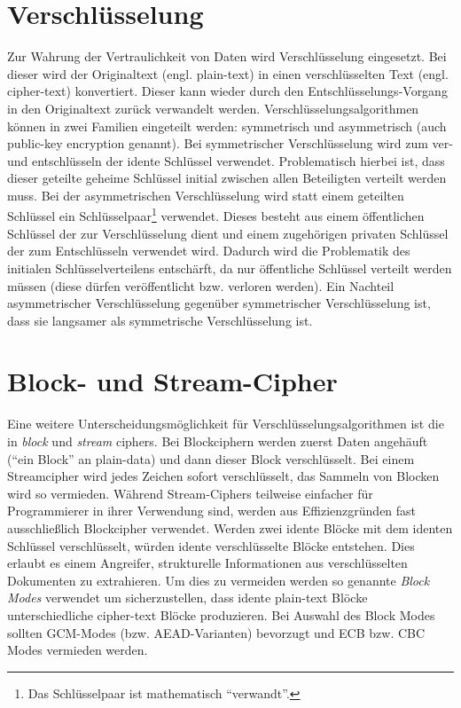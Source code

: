 \section{Verschlüsselung}

Zur Wahrung der Vertraulichkeit von Daten wird Verschlüsselung eingesetzt. Bei dieser wird der Originaltext (engl. plain-text) in einen verschlüsselten Text (engl. cipher-text) konvertiert. Dieser kann wieder durch den Entschlüsselungs-Vorgang in den Originaltext zurück verwandelt werden. Verschlüsselungsalgorithmen können in zwei Familien eingeteilt werden: symmetrisch und asymmetrisch (auch public-key encryption genannt). Bei symmetrischer Verschlüsselung wird zum ver- und entschlüsseln der idente Schlüssel verwendet. Problematisch hierbei ist, dass dieser geteilte geheime Schlüssel initial zwischen allen Beteiligten verteilt werden muss. Bei der asymmetrischen Verschlüsselung wird statt einem geteilten Schlüssel ein Schlüsselpaar\footnote{Das Schlüsselpaar ist mathematisch ``verwandt''.} verwendet. Dieses besteht aus einem öffentlichen Schlüssel der zur Verschlüsselung dient und einem zugehörigen privaten Schlüssel der zum Entschlüsseln verwendet wird. Dadurch wird die Problematik des initialen Schlüsselverteilens entschärft, da nur öffentliche Schlüssel verteilt werden müssen (diese dürfen veröffentlicht bzw. verloren werden). Ein Nachteil asymmetrischer Verschlüsselung gegenüber symmetrischer Verschlüsselung ist, dass sie langsamer als symmetrische Verschlüsselung ist.

\section{Block- und Stream-Cipher}

Eine weitere Unterscheidungsmöglichkeit für Verschlüsselungsalgorithmen ist die in \textit{block} und \textit{stream} ciphers. Bei Blockciphern werden zuerst Daten angehäuft (``ein Block'' an plain-data) und dann dieser Block verschlüsselt. Bei einem Streamcipher wird jedes Zeichen sofort verschlüsselt, das Sammeln von Blocken wird so vermieden. Während Stream-Ciphers teilweise einfacher für Programmierer in ihrer Verwendung sind, werden aus Effizienzgründen fast ausschließlich Blockcipher verwendet. Werden zwei idente Blöcke mit dem identen Schlüssel verschlüsselt, würden idente verschlüsselte Blöcke entstehen. Dies erlaubt es einem Angreifer, strukturelle Informationen aus verschlüsselten Dokumenten zu extrahieren. Um dies zu vermeiden werden so genannte \textit{Block Modes} verwendet um sicherzustellen, dass idente plain-text Blöcke unterschiedliche cipher-text Blöcke produzieren. Bei Auswahl des Block Modes sollten GCM-Modes (bzw. AEAD-Varianten) bevorzugt und ECB bzw. CBC Modes vermieden werden.


